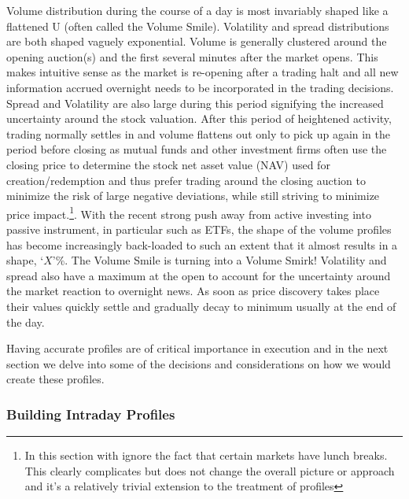 Volume distribution during the course of a day is most invariably shaped like a flattened U (often called the Volume Smile). Volatility and spread distributions are both shaped vaguely exponential. Volume is generally clustered around the opening auction(s) and the first several minutes after the market opens. This makes intuitive sense as the market is re-opening after a trading halt and all new information accrued overnight needs to be incorporated in the trading decisions. Spread and Volatility are also large during this period signifying the increased uncertainty around the stock valuation. After this period of heightened activity,  trading normally settles in and volume flattens out only to pick up again in the period before closing as mutual funds and other investment firms often use the closing price to determine the stock net asset value (NAV) used for creation/redemption and thus prefer trading around the closing auction to minimize the risk of large negative deviations, while still striving to minimize price impact.\footnote{In this section with ignore the fact that certain markets have lunch breaks. This clearly complicates but does not change the overall picture or approach and it's a relatively trivial extension to the treatment of profiles}. With the recent strong push away from active investing into passive instrument, in particular such as ETFs, the shape of the volume profiles has become increasingly back-loaded to such an extent that it almost results in a shape, `$X$'\%. The Volume Smile is turning into a Volume Smirk! Volatility and spread also have a maximum at the open to account for the uncertainty around the market reaction to  overnight news. As soon as price discovery takes place their values quickly settle and gradually decay to minimum usually at the end of the day.\\

\textnote{TODO:  DN. Confirm of the total volume of many stocks happen in the last hour of the trading day]} 

Having accurate profiles are of critical importance in execution and in the next section we delve into some of the decisions and considerations on how we would create these profiles.



\subsubsection{Building Intraday Profiles}

